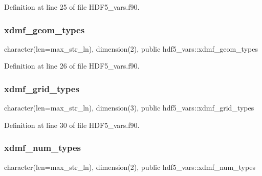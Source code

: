 Definition at line 25 of file H\+D\+F5\+\_\+vars.\+f90.

\mbox{\label{namespacehdf5__vars_acabe6ee64c1612c30ab37774678238e5}} 
\subsubsection{\texorpdfstring{xdmf\+\_\+geom\+\_\+types}{xdmf\_geom\_types}}
{\footnotesize\ttfamily character(len=max\+\_\+str\+\_\+ln), dimension(2), public hdf5\+\_\+vars\+::xdmf\+\_\+geom\+\_\+types}



Definition at line 26 of file H\+D\+F5\+\_\+vars.\+f90.

\mbox{\label{namespacehdf5__vars_ab7b59b4afbcaff92aa1c236c23a4bf58}} 
\subsubsection{\texorpdfstring{xdmf\+\_\+grid\+\_\+types}{xdmf\_grid\_types}}
{\footnotesize\ttfamily character(len=max\+\_\+str\+\_\+ln), dimension(3), public hdf5\+\_\+vars\+::xdmf\+\_\+grid\+\_\+types}



Definition at line 30 of file H\+D\+F5\+\_\+vars.\+f90.

\mbox{\label{namespacehdf5__vars_ad8c38b66b3e9b402f05e7e7a36415fb3}} 
\subsubsection{\texorpdfstring{xdmf\+\_\+num\+\_\+types}{xdmf\_num\_types}}
{\footnotesize\ttfamily character(len=max\+\_\+str\+\_\+ln), dimension(2), public hdf5\+\_\+vars\+::xdmf\+\_\+num\+\_\+types}



